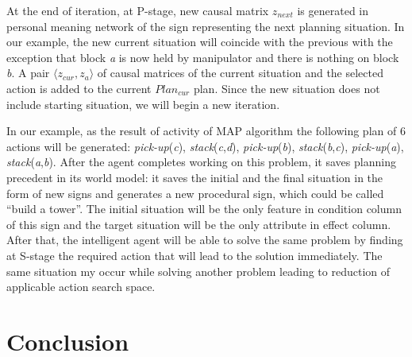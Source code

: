 \documentclass[review]{elsarticle}
\begin{document}
At the end of iteration, at P-stage, new causal matrix $z_{next}$ is generated in personal meaning network of the sign representing the next planning situation. In our example, the new current situation will coincide with the previous with the exception that block \textit{a} is now held by manipulator and there is nothing on block \textit{b}. A pair $\langle z_{cur}, z_a \rangle$ of causal matrices of the current situation and the selected action is added to the current $Plan_{cur}$ plan. Since the new situation does not include starting situation, we will begin a new iteration.

In our example, as the result of activity of MAP algorithm the following plan of 6 actions will be generated: \textit{pick-up}(\textit{c}), \textit{stack}(\textit{c},\textit{d}), \textit{pick-up}(\textit{b}), \textit{stack}(\textit{b},\textit{c}), \textit{pick-up}(\textit{a}), \textit{stack}(\textit{a},\textit{b}). After the agent completes working on this problem, it saves planning precedent in its world model: it saves the initial and the final situation in the form of new signs and generates a new procedural sign, which could be called ``build a tower''. The initial situation will be the only feature in condition column of this sign and the target situation will be the only attribute in effect column. After that, the intelligent agent will be able to solve the same problem by finding at S-stage the required action that will lead to the solution immediately. The same situation my occur while solving another problem leading to reduction of applicable action search space.

	
\section{Conclusion}\label{sec:concl}
\end{document}
